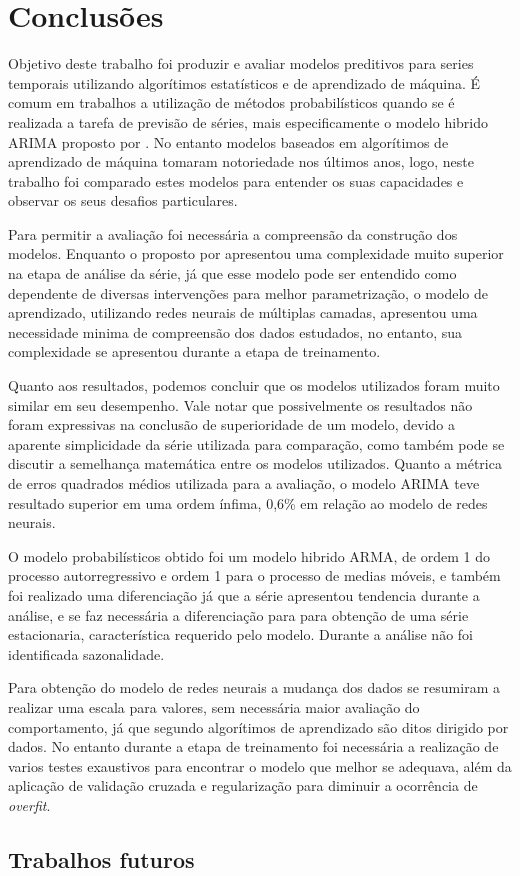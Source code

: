 \documentclass[
    12pt,
    oneside,
    a4paper,
    english,
    brazil
]{abntex2}
\begin{document}
\chapter{Conclusões}\label{chap:concl}

Objetivo deste trabalho  foi produzir e avaliar modelos  preditivos para series
temporais utilizando  algorítimos estatísticos e  de aprendizado de  máquina. É
comum  em  trabalhos  a  utilização  de métodos  probabilísticos  quando  se  é
realizada a tarefa de previsão de séries, mais especificamente o modelo hibrido
ARIMA proposto por . No entanto modelos baseados em algorítimos
de aprendizado  de máquina  tomaram notoriedade nos  últimos anos,  logo, neste
trabalho  foi comparado  estes  modelos  para entender  os  suas capacidades  e
observar os seus desafios particulares.

Para  permitir a  avaliação  foi  necessária a  compreensão  da construção  dos
modelos. Enquanto  o proposto por   apresentou uma complexidade
muito  superior na  etapa de  análise da  série, já  que esse  modelo pode  ser
entendido como dependente de  diversas intervenções para melhor parametrização,
o  modelo  de  aprendizado,  utilizando redes  neurais  de  múltiplas  camadas,
apresentou  uma  necessidade minima  de  compreensão  dos dados  estudados,  no
entanto, sua complexidade se apresentou durante a etapa de treinamento.

Quanto aos resultados,  podemos concluir que os modelos  utilizados foram muito
similar em seu desempenho. Vale notar que possivelmente os resultados não foram
expressivas  na conclusão  de superioridade  de  um modelo,  devido a  aparente
simplicidade da série utilizada para comparação, como também pode se discutir a
semelhança matemática  entre os modelos  utilizados. Quanto a métrica  de erros
quadrados  médios utilizada  para a  avaliação, o  modelo ARIMA  teve resultado
superior em uma ordem ínfima, 0,6\% em relação ao modelo de redes neurais.

O  modelo probabilísticos  obtido foi  um modelo  hibrido ARMA,  de ordem  1 do
processo autorregressivo e  ordem 1 para o processo de  medias móveis, e também
foi realizado uma  diferenciação já que a série apresentou  tendencia durante a
análise, e  se faz necessária a  diferenciação para para obtenção  de uma série
estacionaria, característica requerido  pelo modelo. Durante a  análise não foi
identificada sazonalidade.

Para  obtenção do  modelo de  redes neurais  a mudança  dos dados  se resumiram
a  realizar  uma  escala  para  valores,  sem  necessária  maior  avaliação  do
comportamento, já  que segundo   algorítimos  de aprendizado
são ditos  dirigido por dados.  No entanto durante  a etapa de  treinamento foi
necessária a realização de varios testes exaustivos para encontrar o modelo que
melhor se adequava, além da aplicação de validação cruzada e regularização para
diminuir a ocorrência de \textit{overfit}.

\section{Trabalhos futuros}

\postextual


\end{document}
